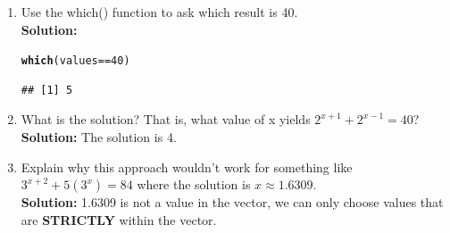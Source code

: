 \documentclass{article}\usepackage[]{graphicx}\usepackage[]{xcolor}
\makeatletter
\newcommand{\hlnum}[1]{\textcolor[rgb]{0.686,0.059,0.569}{#1}}%
\newcommand{\hlopt}[1]{\textcolor[rgb]{0,0,0}{#1}}%
\newcommand{\hldef}[1]{\textcolor[rgb]{0.345,0.345,0.345}{#1}}%
\newcommand{\hlkwd}[1]{\textcolor[rgb]{0.737,0.353,0.396}{\textbf{#1}}}%
\newenvironment{kframe}{%
 \def\at@end@of@kframe{}%
 \ifinner\ifhmode%
  \def\at@end@of@kframe{\end{minipage}}%
  \begin{minipage}{\columnwidth}%
 \fi\fi%
 \def\FrameCommand##1{\hskip\@totalleftmargin \hskip-\fboxsep
 \colorbox{shadecolor}{##1}\hskip-\fboxsep
     \hskip-\linewidth \hskip-\@totalleftmargin \hskip\columnwidth}%
 \MakeFramed {\advance\hsize-\width
   \@totalleftmargin\z@ \linewidth\hsize
   \@setminipage}}%
 {\par\unskip\endMakeFramed%
 \at@end@of@kframe}
\newenvironment{knitrout}{}{} %
\makeatother
\begin{document}
\begin{enumerate}
\begin{enumerate}
  \item Use the which() function to ask which result is 40.\\
\textbf{Solution:}
\begin{knitrout}
\color{fgcolor}\begin{kframe}
\begin{alltt}
\hlkwd{which}\hldef{(values} \hlopt{==} \hlnum{40}\hldef{)}
\end{alltt}
\begin{verbatim}
## [1] 5
\end{verbatim}
\end{kframe}
\end{knitrout}

  \item What is the solution? That is, what value of x yields $2^{x+1} +2^{x-1} = 40$?\\
\textbf{Solution:} The solution is 4.
  \item Explain why this approach wouldn't work for something like $3^{x+2} + 5 (3^x) = 84$ where the solution is $x \approx 1.6309$.\\
\textbf{Solution:} 1.6309 is not a value in the vector, we can only choose values that are \textbf{STRICTLY} within the vector.
\end{enumerate}
\end{enumerate}


\end{document}
